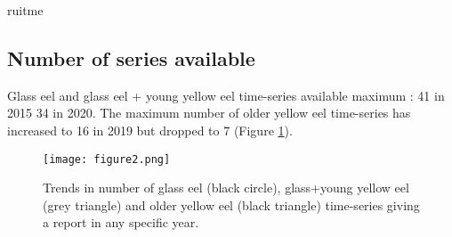 ruitme\documentclass[pdftex,11pt,a4paper]{report}
\begin{document}
	

	

	
 
 
	
 
 
 
\subsection{Number of series available}


Glass eel and glass eel + young yellow eel time-series available maximum :
41 in
2015
34 in 2020. The maximum number of older
yellow eel time-series has increased to 16 in
2019 but dropped to
7 (Figure \ref{figure2}).

\begin{figure}[H]
\centering
\texttt{[image: figure2.png]}
\caption{Trends in number of glass eel (black circle), glass+young yellow eel
(grey triangle) and older yellow eel (black triangle) time-series giving a
report in  any specific year.}
\label{figure2}
\end{figure}
 
 
 



\end{document}
